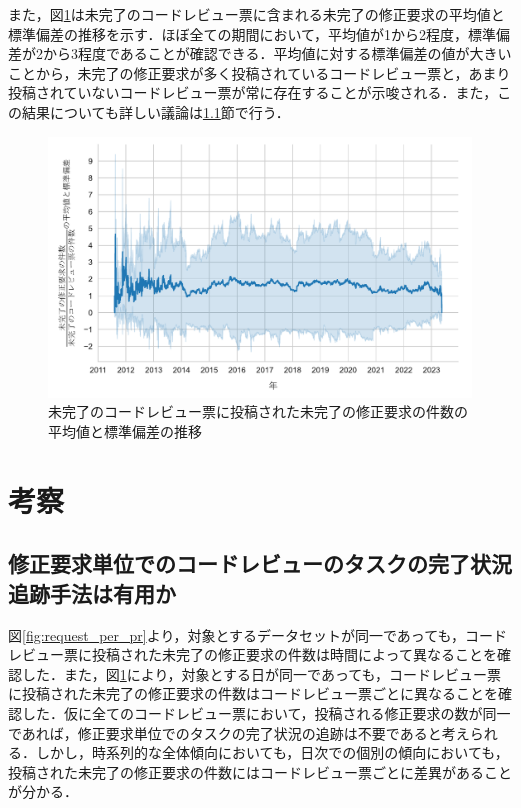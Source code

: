 \documentclass[11pt]{jreport}
\begin{document}
また，図\ref{fig:standard_deviation}は未完了のコードレビュー票に含まれる未完了の修正要求の平均値と標準偏差の推移を示す．ほぼ全ての期間において，平均値が1から2程度，標準偏差が2から3程度であることが確認できる．平均値に対する標準偏差の値が大きいことから，未完了の修正要求が多く投稿されているコードレビュー票と，あまり投稿されていないコードレビュー票が常に存在することが示唆される．また，この結果についても詳しい議論は\ref{subsec:utility}節で行う．

\begin{figure}[t]
\centerline{\includegraphics[width=1.0\linewidth]{@BSthesis2024_Kawasaki/BSthesis2024_Kawasaki_fig/standard_deviation.pdf}}
\caption{未完了のコードレビュー票に投稿された未完了の修正要求の件数の平均値と標準偏差の推移}
\label{fig:standard_deviation}
\end{figure}

\chapter{考察}\label{chap:discussion}

\section{修正要求単位でのコードレビューのタスクの完了状況追跡手法は有用か}\label{subsec:utility}
図\ref{fig:request_per_pr}より，対象とするデータセットが同一であっても，コードレビュー票に投稿された未完了の修正要求の件数は時間によって異なることを確認した．また，図\ref{fig:standard_deviation}により，対象とする日が同一であっても，コードレビュー票に投稿された未完了の修正要求の件数はコードレビュー票ごとに異なることを確認した．仮に全てのコードレビュー票において，投稿される修正要求の数が同一であれば，修正要求単位でのタスクの完了状況の追跡は不要であると考えられる．しかし，時系列的な全体傾向においても，日次での個別の傾向においても，投稿された未完了の修正要求の件数にはコードレビュー票ごとに差異があることが分かる．
\end{document}
